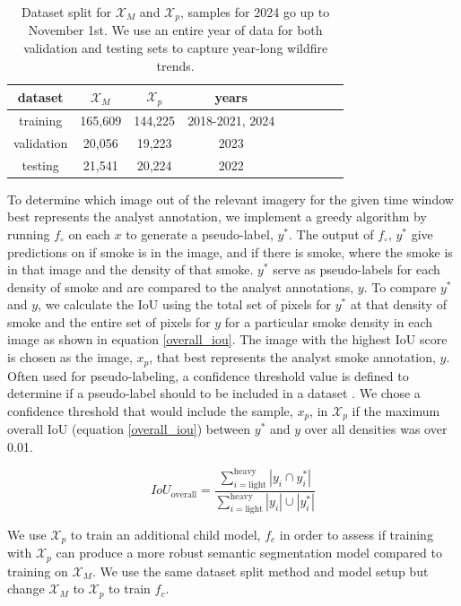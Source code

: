 \begin{table}[h] 
    \caption{Dataset split for \(\mathcal{X}_M\) and \(\mathcal{X}_p\), samples for 2024 go up to November 1st. We use an entire year of data for both validation and testing sets to capture year-long wildfire trends.}\label{split}
    \centering
    \begin{tabular}{ccccrrcrc}
        \toprule
        dataset & \(\mathcal{X}_M\) & \(\mathcal{X}_p\) &years\\
        \midrule
        training & 165,609 & 144,225 &2018-2021, 2024\\
        validation & 20,056 & 19,223 &2023 \\
        testing & 21,541 & 20,224 & 2022 \\
        \bottomrule
    \end{tabular}
\end{table}

To determine which image out of the relevant imagery for the given time window best represents the analyst annotation, we implement a greedy algorithm by running \(f_{\circ}\) on each \(x\) to generate a pseudo-label, \(y^*\). The output of \(f_{\circ}\), \(y^*\) give predictions on if smoke is in the image, and if there is smoke, where the smoke is in that image and the density of that smoke. \(y^*\) serve as pseudo-labels for each density of smoke and are compared to the analyst annotations, \(y\). To compare \(y^*\) and \(y\), we calculate the IoU using the total set of pixels for \(y^*\) at that density of smoke and the entire set of pixels for \(y\) for a particular smoke density in each image as shown in equation \ref{overall_iou}. The image with the highest IoU score is chosen as the image, \(x_p\), that best represents the analyst smoke annotation, \(y\). Often used for pseudo-labeling, a confidence threshold value is defined to determine if a pseudo-label should to be included in a dataset \cite{conf_thresh}. We chose a confidence threshold that would include the sample, \(x_p\), in \(\mathcal{X}_{p}\) if the maximum overall IoU (equation \ref{overall_iou}) between \(y^*\) and \(y\) over all densities was over 0.01. 

\begin{equation} \label{overall_iou}
    IoU_{\text{overall}} = \frac{\sum\limits_{i=\text{light}}^{\text{heavy}}|y_{i}\cap y^*_{i}|}{\sum\limits_{i=\text{light}}^{\text{heavy}}|y_{i}|\cup|y^*_{i}|}
\end{equation}

We use \(\mathcal{X}_{p}\) to train an additional child model, \(f_c\) in order to assess if training with \(\mathcal{X}_{p}\) can produce a more robust semantic segmentation model compared to training on \(\mathcal{X}_M\). We use the same dataset split method and model setup but change \(\mathcal{X}_M\) to \(\mathcal{X}_{p}\) to train \(f_c\).

